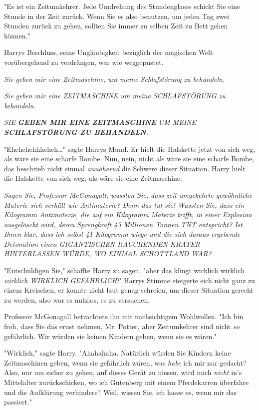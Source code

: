{"Es ist ein Zeitumkehrer. Jede Umdrehung des Stundenglases schickt Sie eine Stunde in der Zeit zurück. Wenn Sie es also benutzen, um jeden Tag zwei Stunden zurück zu gehen, sollten Sie immer zu selben Zeit zu Bett gehen können."

Harrys Beschluss, seine Ungläubigkeit bezüglich der magischen Welt vorübergehend zu verdrängen, war wie weggepustet.

\emph{Sie geben mir eine Zeitmaschine, um meine Schlafstörung zu behandeln.}

\emph{Sie geben mir eine ZEITMASCHINE um meine SCHLAFSTÖRUNG zu behandeln.}

\emph{SIE} \emph{\textbf{\emph{GEBEN MIR EINE ZEITMASCHINE}}} \emph{UM MEINE} \emph{\textbf{\emph{SCHLAFSTÖRUNG ZU BEHANDELN}}.}

"Ehehehehhheheh…" sagte Harrys Mund. Er hielt die Halskette jetzt von sich weg, als wäre sie eine scharfe Bombe. Nun, nein, nicht als wäre sie eine scharfe Bombe, das beschrieb nicht einmal \emph{annähernd} die Schwere dieser Situation. Harry hielt die Halskette von sich weg, als wäre sie eine Zeitmaschine.

\emph{Sagen Sie, Professor McGonagall, wussten Sie, dass zeit-umgekehrte gewöhnliche Materie sich verhält wie Antimaterie? Denn das tut sie! Wussten Sie, dass ein Kilogramm Antimaterie, die auf ein Kilogramm Materie trifft, in einer Explosion ausgelöscht wird, deren Sprengkraft 43 Millionen Tonnen TNT entspricht? Ist Ihnen klar, dass ich selbst 41 Kilogramm wiege und die sich daraus ergebende Detonation einen GIGANTISCHEN RAUCHENDEN KRATER HINTERLASSEN WÜRDE, WO EINMAL SCHOTTLAND WAR?}

"Entschuldigen Sie," schaffte Harry zu sagen, "aber das klingt wirklich wirklich \emph{wirklich WIRKLICH GEFÄHRLICH!}" Harrys Stimme steigerte sich nicht ganz zu einem Kreischen, er konnte nicht laut genug schreien, um dieser Situation gerecht zu werden, also war es nutzlos, es zu versuchen.

Professor McGonagall betrachtete ihn mit nachsichtigem Wohlwollen. "Ich bin froh, dass Sie das ernst nehmen, Mr. Potter, aber Zeitumkehrer sind nicht \emph{so} gefährlich. Wir würden sie keinen Kindern geben, wenn sie es wären."

"Wirklich," sagte Harry. "Ahahahaha. Natürlich würden Sie Kindern keine Zeitmaschinen geben, wenn sie gefährlich wären, was \emph{habe} ich mir nur gedacht? Also, nur um sicher zu gehen, auf dieses Gerät zu niesen, wird mich \emph{nicht} in's Mittelalter zurückschicken, wo ich Gutenberg mit einem Pferdekarren überfahre und die Aufklärung verhindere? Weil, wissen Sie, ich hasse es, wenn mir das passiert."

}
